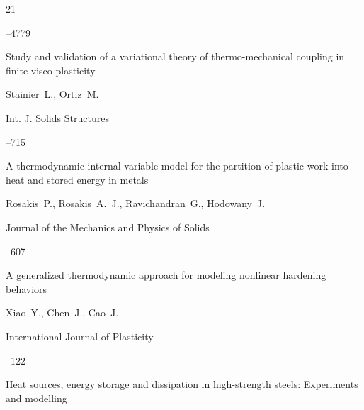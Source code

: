 \begin{thebibliography}{21}



--4779





\paper Study and validation of a variational theory of thermo-mechanical coupling in finite visco-plasticity

\by Stainier~L., Ortiz~M.

\jour Int. J. Solids Structures




--715





\paper A thermodynamic internal variable model for the partition of plastic work into heat and stored energy in metals

\by Rosakis~P., Rosakis~A.~J., Ravichandran~G., Hodowany~J.

\jour Journal of the Mechanics and Physics of Solids




--607





\paper A generalized thermodynamic approach for modeling nonlinear hardening behaviors

\by Xiao~Y., Chen~J., Cao~J.

\jour International Journal of Plasticity



--122





\paper Heat sources, energy storage and dissipation in high-strength steels: Experiments and modelling


\end{thebibliography}
